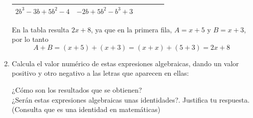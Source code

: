 \documentclass[10pt,twoside]{article}
\begin{document}
\begin{enumerate}
\begin{center}
\begin{tabular}{|l|l|c|c|c|c|}
\hline 
$2b^{3}-3b+5b^{2}-4$ & $-2b+5b^{2}-b^{3}+3$ &  &  &  &  \\ 
\hline 
\end{tabular} 
\end{center}
En la tabla resulta $2x+8$, ya que en la primera fila, $A=x+5$ y $B=x+3$, por lo tanto \[A+B=(x+5)+(x+3)=(x+x)+(5+3)=2x+8\]
\item Calcula el valor numérico de estas expresiones algebraicas, dando un valor positivo y otro negativo a las letras que aparecen en ellas:
\begin{enumerate}
\end{enumerate}
¿Cómo son los resultados que se obtienen?\\
¿Serán estas expresiones algebraicas unas identidades?. Justifica tu respuesta. (Consulta que es una identidad en matemáticas)
\end{enumerate}
\end{document}
